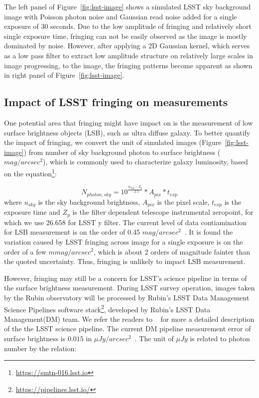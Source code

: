 \documentclass[twocolumn]{aastex63} %
\begin{document}
\begin{CJK*}{UTF8}{gbsn}
The left panel of Figure~\ref{fig:lsst-image} shows a simulated LSST sky background image with Poisson photon noise and Gaussian read noise added for a single exposure of $30$ seconds. Due to the low amplitude of fringing and relatively short single exposure time, fringing can not be easily observed as the image is mostly dominated by noise. However, after applying a 2D Gaussian kernel, which serves as a low pass filter to extract low amplitude structure on relatively large scales in image progressing, to the image, the fringing patterns become apparent as shown in right panel of Figure~\ref{fig:lsst-image}. 

\subsection{Impact of LSST fringing on measurements}

One potential area that fringing might have impact on is the measurement of low surface brightness objects (LSB), such as ultra diffuse galaxy.
To better quantify the impact of fringing, we convert the unit of simulated images (Figure~\ref{fig:lsst-image}) from number of sky background photon to surface brightness ($mag/arcsec^{2}$), which is commonly used to characterize galaxy luminosity, based on the equation\footnote{\url{https://smtn-016.lsst.io}}:

\begin{equation}
    N_{photon,sky} = 10^{\frac{u_{sky}-Z_p}{-2.5}}*A_{pix}*t_{exp}
\end{equation}
where $u_{sky}$ is the sky background brightness, $A_{pix}$ is the pixel scale, $t_{exp}$ is the exposure time and $Z_p$ is the filter dependent telescope instrumental zeropoint, for which we use 26.658 for LSST y filter. The current level of data contiamination for LSB measurement is on the order of 0.45 $mag/arcsec^{2}$~\citep{Lee22}. It is found the variation caused by LSST fringing across image for a single exposure is on the order of a few $mmag/arcsec^{2}$, which is about 2 orders of magnitude fainter than the quoted uncertainty. Thus, fringing is unlikely to impact LSB measurement.

However, fringing may still be a concern for LSST's science pipeline in terms of the surface brightness measurement. During LSST survey operation, images taken by the Rubin observatory will be processed by Rubin's LSST Data Management Science Pipelines software stack\footnote{\url{https://pipelines.lsst.io/}}, developed by Rubin's LSST Data Management(DM) team. We refer the readers to ~\citet{Bos18} for more a detailed description of the the LSST science pipeline. The current DM pipeline measurement error of surface brightness is $0.015$ in $\mu Jy/arcsec^{2}$~\citep{rlh}. The unit of $\mu Jy$ is related to photon number by the relation:


\end{CJK*}
\end{document}
